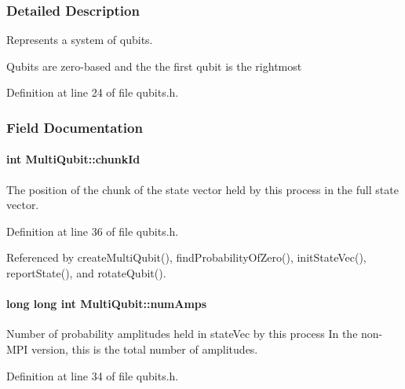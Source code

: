 \subsubsection{Detailed Description}
Represents a system of qubits. 

Qubits are zero-\/based and the the first qubit is the rightmost 

Definition at line 24 of file qubits.\+h.



\subsubsection{Field Documentation}
\paragraph[{\texorpdfstring{chunk\+Id}{chunkId}}]{\setlength{\rightskip}{0pt plus 5cm}int Multi\+Qubit\+::chunk\+Id}\hypertarget{structMultiQubit_ab10c88249fa3825d6227ceec01d37e37}{}\label{structMultiQubit_ab10c88249fa3825d6227ceec01d37e37}


The position of the chunk of the state vector held by this process in the full state vector. 



Definition at line 36 of file qubits.\+h.



Referenced by create\+Multi\+Qubit(), find\+Probability\+Of\+Zero(), init\+State\+Vec(), report\+State(), and rotate\+Qubit().

\paragraph[{\texorpdfstring{num\+Amps}{numAmps}}]{\setlength{\rightskip}{0pt plus 5cm}long long int Multi\+Qubit\+::num\+Amps}\hypertarget{structMultiQubit_ae16f47d8b725c914fb7f66b6498d79db}{}\label{structMultiQubit_ae16f47d8b725c914fb7f66b6498d79db}


Number of probability amplitudes held in state\+Vec by this process In the non-\/\+M\+PI version, this is the total number of amplitudes. 



Definition at line 34 of file qubits.\+h.



